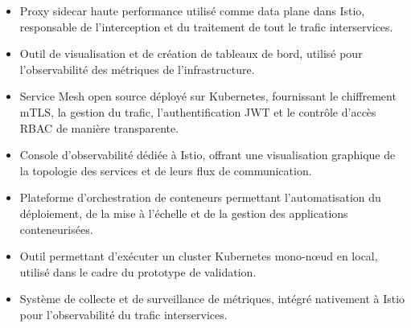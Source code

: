\begin{itemize}[leftmargin=3.2cm, labelwidth=3cm, align=left, itemsep=6pt]

  

  \item[\textbf{Envoy}] Proxy sidecar haute performance utilisé comme data plane dans
        Istio, responsable de l'interception et du traitement de tout le trafic interservices.

  \item[\textbf{Grafana}] Outil de visualisation et de création de tableaux de bord,
        utilisé pour l'observabilité des métriques de l'infrastructure.

  \item[\textbf{Istio}] Service Mesh open source déployé sur Kubernetes, fournissant
        le chiffrement mTLS, la gestion du trafic, l'authentification JWT et le contrôle
        d'accès RBAC de manière transparente.

  \item[\textbf{Kiali}] Console d'observabilité dédiée à Istio, offrant une visualisation
        graphique de la topologie des services et de leurs flux de communication.

  \item[\textbf{Kubernetes}] Plateforme d'orchestration de conteneurs permettant
        l'automatisation du déploiement, de la mise à l'échelle et de la gestion
        des applications conteneurisées.

  \item[\textbf{Minikube}] Outil permettant d'exécuter un cluster Kubernetes
        mono-nœud en local, utilisé dans le cadre du prototype de validation.


  \item[\textbf{Prometheus}] Système de collecte et de surveillance de métriques,
        intégré nativement à Istio pour l'observabilité du trafic interservices.

  

\end{itemize}